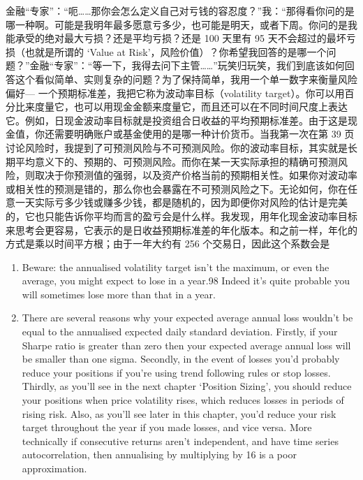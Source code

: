 \begin{chineseblock}金融“专家”：“呃……那你会怎么定义自己对亏钱的容忍度？”我：“那得看你问的是哪一种啊。可能是我明年最多愿意亏多少，也可能是明天，或者下周。你问的是我能承受的绝对最大亏损？还是平均亏损？还是 100 天里有 95 天不会超过的最坏亏损（也就是所谓的 ‘Value at Risk’，风险价值）？你希望我回答的是哪一个问题？”金融“专家”：“等一下，我得去问下主管……”玩笑归玩笑，我们到底该如何回答这个看似简单、实则复杂的问题？为了保持简单，我用一个单一数字来衡量风险偏好--- 一个预期标准差，我把它称为波动率目标（volatility target）。你可以用百分比来度量它，也可以用现金金额来度量它，而且还可以在不同时间尺度上表达它。例如，日现金波动率目标就是投资组合日收益的平均预期标准差。由于这是现金值，你还需要明确账户或基金使用的是哪一种计价货币。当我第一次在第 39 页讨论风险时，我提到了可预测风险与不可预测风险。你的波动率目标，其实就是长期平均意义下的、预期的、可预测风险。而你在某一天实际承担的精确可预测风险，则取决于你预测值的强弱，以及资产价格当前的预期相关性。如果你对波动率或相关性的预测是错的，那么你也会暴露在不可预测风险之下。无论如何，你在任意一天实际亏多少钱或赚多少钱，都是随机的，因为即便你对风险的估计是完美的，它也只能告诉你平均而言的盈亏会是什么样。我发现，用年化现金波动率目标来思考会更容易，它表示的是日收益预期标准差的年化版本。和之前一样，年化的方式是乘以时间平方根；由于一年大约有 256 个交易日，因此这个系数会是\end{chineseblock}

\begin{enumerate}
\item Beware: the annualised volatility target isn't the maximum, or even the average, you might expect to lose in a year.98 Indeed it's quite probable you will sometimes lose more than that in a year.
\item There are several reasons why your expected average annual loss wouldn't be equal to the annualised expected daily standard deviation. Firstly, if your Sharpe ratio is greater than zero then your expected average annual loss will be smaller than one sigma. Secondly, in the event of losses you'd probably reduce your positions if you're using trend following rules or stop losses. Thirdly, as you'll see in the next chapter ‘Position Sizing', you should reduce your positions when price volatility rises, which reduces losses in periods of rising risk. Also, as you'll see later in this chapter, you'd reduce your risk target throughout the year if you made losses, and vice versa. More technically if consecutive returns aren't independent, and have time series autocorrelation, then annualising by multiplying by 16 is a poor approximation. \end{enumerate}

